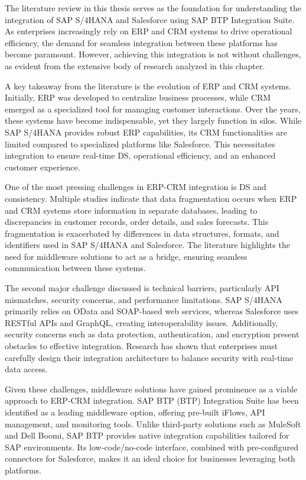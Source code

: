 The literature review in this thesis serves as the foundation for understanding the integration of SAP S/4HANA and Salesforce using SAP BTP Integration Suite. As enterprises increasingly rely on ERP and CRM systems to drive operational efficiency, the demand for seamless integration between these platforms has become paramount. However, achieving this integration is not without challenges, as evident from the extensive body of research analyzed in this chapter.

A key takeaway from the literature is the evolution of ERP and CRM systems. Initially, ERP was developed to centralize business processes, while CRM emerged as a specialized tool for managing customer interactions. Over the years, these systems have become indispensable, yet they largely function in silos. While SAP S/4HANA provides robust ERP capabilities, its CRM functionalities are limited compared to specialized platforms like Salesforce. This necessitates integration to ensure real-time DS, operational efficiency, and an enhanced customer experience.

One of the most pressing challenges in ERP-CRM integration is DS and consistency. Multiple studies indicate that data fragmentation occurs when ERP and CRM systems store information in separate databases, leading to discrepancies in customer records, order details, and sales forecasts. This fragmentation is exacerbated by differences in data structures, formats, and identifiers used in SAP S/4HANA and Salesforce. The literature highlights the need for middleware solutions to act as a bridge, ensuring seamless communication between these systems.

The second major challenge discussed is technical barriers, particularly API mismatches, security concerns, and performance limitations. SAP S/4HANA primarily relies on OData and SOAP-based web services, whereas Salesforce uses RESTful APIs and GraphQL, creating interoperability issues. Additionally, security concerns such as data protection, authentication, and encryption present obstacles to effective integration. Research has shown that enterprises must carefully design their integration architecture to balance security with real-time data access.

Given these challenges, middleware solutions have gained prominence as a viable approach to ERP-CRM integration. SAP BTP (BTP) Integration Suite has been identified as a leading middleware option, offering pre-built iFlows, API management, and monitoring tools. Unlike third-party solutions such as MuleSoft and Dell Boomi, SAP BTP provides native integration capabilities tailored for SAP environments. Its low-code/no-code interface, combined with pre-configured connectors for Salesforce, makes it an ideal choice for businesses leveraging both platforms.


